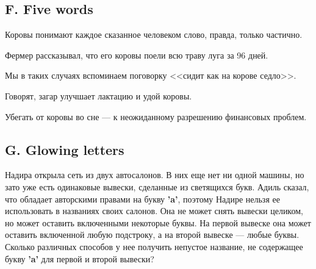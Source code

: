 \subsection*{F. Five words}

\noindent
Коровы понимают каждое сказанное человеком слово, правда, только частично.

\noindent
Фермер рассказывал, что его коровы поели всю траву луга за 96 дней.

\noindent
Мы в таких случаях вспоминаем поговорку <<сидит как на корове седло>>.

\noindent
Говорят, загар улучшает лактацию и удой коровы.

\noindent
Убегать от коровы во сне --- к неожиданному разрешению финансовых проблем.






\subsection*{G. Glowing letters}

Надира открыла сеть из двух автосалонов. В них еще нет ни одной машины, но зато уже есть одинаковые вывески, сделанные из светящихся букв. Адиль сказал, что обладает авторскими правами на букву \textbf{'a'}, поэтому Надире нельзя ее использовать в названиях своих салонов. Она не может снять вывески целиком, но может оставить включенными некоторые буквы. На первой вывеске она может оставить включенной любую подстроку, а на второй вывеске --- любые буквы. Сколько различных способов у нее получить непустое название, не содержащее букву \textbf{'a'} для первой и второй вывески?







